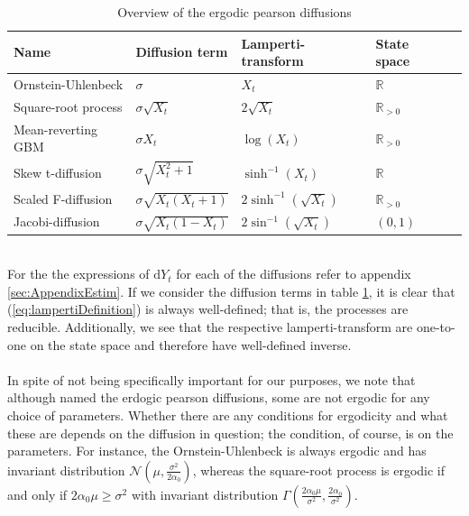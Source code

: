 \begin{table}[h!]
    \begin{center}
    \begin{tabular}{lllll}\hline
    \textbf{Name} & \textbf{Diffusion term} & \textbf{Lamperti-transform} & \textbf{State space}\\ \hline
    Ornstein-Uhlenbeck  & $\sigma$  & $X_t$ & $\mathbb{R}$ \\
    Square-root process & $\sigma\sqrt{X_t}$  & $ 2\sqrt{X_t}$ & $\mathbb{R}_{>0}$ \\
    Mean-reverting GBM  & $\sigma X_t $  & $ \log\left(X_t\right)$  & $\mathbb{R}_{>0}$ \\
    Skew t-diffusion  & $\sigma\sqrt{X_t^2 + 1}$  & $ \sinh^{-1}(X_t)$ & $\mathbb{R}$\\
    Scaled F-diffusion  & $\sigma\sqrt{X_t\left(X_t + 1\right)}$  & $ 2\sinh^{-1}\left(\sqrt{X_t}\right)$ & $\mathbb{R}_{>0}$ \\
    Jacobi-diffusion  & $\sigma\sqrt{X_t\left(1 - X_t\right)}$  & $ 2\sin^{-1}\left(\sqrt{X_t}\right)$ & $(0, 1)$ \\ \hline
    \end{tabular}
    \caption{Overview of the ergodic pearson diffusions}
    \label{table:ergodicDiffusions}
\end{center}
\end{table}\\
For the the expressions of $\mathrm{d}Y_t$ for each of the diffusions refer to appendix \ref{sec:AppendixEstim}. If we consider the diffusion terms in table \ref{table:ergodicDiffusions}, it is clear that (\ref{eq:lampertiDefinition}) is always well-defined; that is, the processes are reducible. Additionally, we see that the respective lamperti-transform are one-to-one on the state space and therefore have well-defined inverse. \\\\
In spite of not being specifically important for our purposes, we note that although named the erdogic pearson diffusions, some are not ergodic for any choice of parameters. Whether there are any conditions for ergodicity and what these are depends on the diffusion in question; the condition, of course, is on the parameters. For instance, the Ornstein-Uhlenbeck is always ergodic and has invariant distribution $\mathcal{N}\left(\mu, \frac{\sigma^2}{2\alpha_0}\right)$, whereas the square-root process is ergodic if and only if $2\alpha_0\mu\geq \sigma^2$ with invariant distribution $\Gamma\left(\frac{2\alpha_0\mu}{\sigma^2}, \frac{2\alpha_0}{\sigma^2}\right)$. \\
